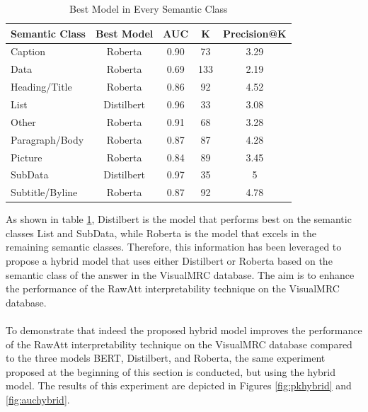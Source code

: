 \begin{table}[ht]
    \centering
    \caption{Best Model in Every Semantic Class}
    \label{tabla:bestmodel}
    \begin{tabularx}{\textwidth}{|X|c|c|c|c|}
        \hline
        \textbf{Semantic Class} & \textbf{Best Model} & \textbf{AUC} & \textbf{K} & \textbf{Precision@K} \\
        \hline
        Caption & Roberta & 0.90 & 73 & 3.29 \\
        Data & Roberta & 0.69 & 133 & 2.19 \\
        Heading/Title & Roberta & 0.86 & 92 & 4.52 \\
        List & Distilbert & 0.96 & 33 & 3.08 \\
        Other & Roberta & 0.91 & 68 & 3.28 \\
        Paragraph/Body & Roberta & 0.87 & 87 & 4.28 \\
        Picture & Roberta & 0.84 & 89 & 3.45 \\
        SubData & Distilbert & 0.97 & 35 & 5 \\
        Subtitle/Byline & Roberta & 0.87 & 92 & 4.78 \\
        \hline
    \end{tabularx}
\end{table}


As shown in table \ref{tabla:bestmodel}, Distilbert is the model that performs best on the semantic classes List and SubData, while Roberta is the model that excels in the remaining semantic classes. Therefore, this information has been leveraged to propose a hybrid model that uses either Distilbert or Roberta based on the semantic class of the answer in the VisualMRC database. The aim is to enhance the performance of the RawAtt interpretability technique on the VisualMRC database.
\\\\
To demonstrate that indeed the proposed hybrid model improves the performance of the RawAtt interpretability technique on the VisualMRC database compared to the three models BERT, Distilbert, and Roberta, the same experiment proposed at the beginning of this section is conducted, but using the hybrid model. The results of this experiment are depicted in Figures \ref{fig:pkhybrid} and \ref{fig:auchybrid}. \newpage


